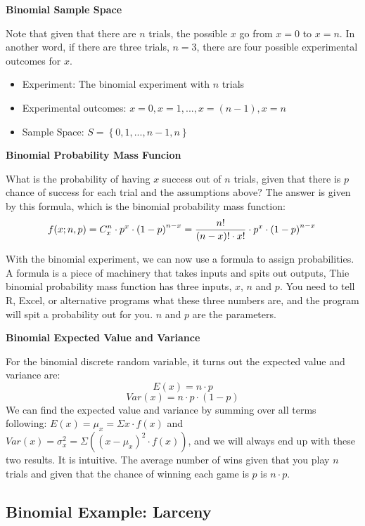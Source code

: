 \documentclass[
]{book}
\providecommand{\tightlist}{%
  \setlength{\itemsep}{0pt}\setlength{\parskip}{0pt}}
\begin{document}
\textbf{Binomial Sample Space}

Note that given that there are \(n\) trials, the possible \(x\) go from \(x=0\) to \(x=n\). In another word, if there are three trials, \(n=3\), there are four possible experimental outcomes for \(x\).

\begin{itemize}
\tightlist
\item
  Experiment: The binomial experiment with \(n\) trials
\item
  Experimental outcomes: \(x=0,x=1,...,x=\left(n-1\right),x=n\)
\item
  Sample Space: \(S=\left\{0,1,...,n-1,n\right\}\)
\end{itemize}

\textbf{Binomial Probability Mass Funcion}

What is the probability of having \(x\) success out of \(n\) trials, given that there is \(p\) chance of success for each trial and the assumptions above? The answer is given by this formula, which is the binomial probability mass function:
\[
f(x;n,p) = C^{n}_{x} \cdot p^x \cdot \left(1-p\right)^{n-x}
         = \frac{n!}{\left(n-x\right)! \cdot x!} \cdot p^x \cdot \left(1-p\right)^{n-x}\\
\]

With the binomial experiment, we can now use a formula to assign probabilities. A formula is a piece of machinery that takes inputs and spits out outputs, Thie binomial probability mass function has three inputs, \(x\), \(n\) and \(p\). You need to tell R, Excel, or alternative programs what these three numbers are, and the program will spit a probability out for you. \(n\) and \(p\) are the parameters.

\textbf{Binomial Expected Value and Variance}

For the binomial discrete random variable, it turns out the expected value and variance are:
\[E(x) = n \cdot p\]
\[Var(x) = n \cdot p \cdot (1-p)\]
We can find the expected value and variance by summing over all terms following: \(E(x) = \mu_x = \Sigma x \cdot f(x)\) and \(Var(x) = \sigma_x^2 = \Sigma \left( (x - \mu_x)^2 \cdot f(x) \right)\), and we will always end up with these two results. It is intuitive. The average number of wins given that you play \(n\) trials and given that the chance of winning each game is \(p\) is \(n \cdot p\).

\hypertarget{binomial-example-larceny}{%
\subsection{Binomial Example: Larceny}\label{binomial-example-larceny}}
\end{document}
